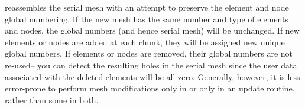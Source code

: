       reassembles the serial mesh with an attempt to
     preserve the element and node global numbering.  If the new mesh
     has the same number and type of elements and nodes, the global
     numbers (and hence serial mesh) will be unchanged.  If new
     elements or nodes are added at each chunk, they will be assigned
     new unique global numbers.  If elements or nodes are removed,
     their global numbers are not re-used-- you can detect the
     resulting holes in the serial mesh since the user data associated
     with the deleted elements will be all zero.  Generally, however, it
     is less error-prone to perform mesh modifications only in 
     or only in an update routine, rather than some in both.


